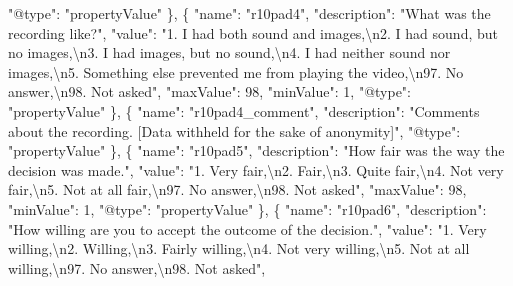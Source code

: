 \documentclass[
]{book}
\newenvironment{Shaded}{\begin{snugshade}}{\end{snugshade}}
\newcommand{\CharTok}[1]{\textcolor[rgb]{0.31,0.60,0.02}{#1}}
\newcommand{\DataTypeTok}[1]{\textcolor[rgb]{0.13,0.29,0.53}{#1}}
\newcommand{\DecValTok}[1]{\textcolor[rgb]{0.00,0.00,0.81}{#1}}
\newcommand{\FunctionTok}[1]{\textcolor[rgb]{0.00,0.00,0.00}{#1}}
\newcommand{\OtherTok}[1]{\textcolor[rgb]{0.56,0.35,0.01}{#1}}
\newcommand{\StringTok}[1]{\textcolor[rgb]{0.31,0.60,0.02}{#1}}
\begin{document}
\begin{Shaded}
\begin{Highlighting}[]
      \DataTypeTok{"@type"}\FunctionTok{:} \StringTok{"propertyValue"}
    \FunctionTok{\}}\OtherTok{,}
    \FunctionTok{\{}
      \DataTypeTok{"name"}\FunctionTok{:} \StringTok{"r10pad4"}\FunctionTok{,}
      \DataTypeTok{"description"}\FunctionTok{:} \StringTok{"What was the recording like?"}\FunctionTok{,}
      \DataTypeTok{"value"}\FunctionTok{:} \StringTok{"1. I had both sound and images,}\CharTok{\textbackslash{}n}\StringTok{2. I had sound, but no images,}\CharTok{\textbackslash{}n}\StringTok{3. I had images, but no sound,}\CharTok{\textbackslash{}n}\StringTok{4. I had neither sound nor images,}\CharTok{\textbackslash{}n}\StringTok{5. Something else prevented me from playing the video,}\CharTok{\textbackslash{}n}\StringTok{97. No answer,}\CharTok{\textbackslash{}n}\StringTok{98. Not asked"}\FunctionTok{,}
      \DataTypeTok{"maxValue"}\FunctionTok{:} \DecValTok{98}\FunctionTok{,}
      \DataTypeTok{"minValue"}\FunctionTok{:} \DecValTok{1}\FunctionTok{,}
      \DataTypeTok{"@type"}\FunctionTok{:} \StringTok{"propertyValue"}
    \FunctionTok{\}}\OtherTok{,}
    \FunctionTok{\{}
      \DataTypeTok{"name"}\FunctionTok{:} \StringTok{"r10pad4_comment"}\FunctionTok{,}
      \DataTypeTok{"description"}\FunctionTok{:} \StringTok{"Comments about the recording. [Data withheld for the sake of anonymity]"}\FunctionTok{,}
      \DataTypeTok{"@type"}\FunctionTok{:} \StringTok{"propertyValue"}
    \FunctionTok{\}}\OtherTok{,}
    \FunctionTok{\{}
      \DataTypeTok{"name"}\FunctionTok{:} \StringTok{"r10pad5"}\FunctionTok{,}
      \DataTypeTok{"description"}\FunctionTok{:} \StringTok{"How fair was the way the decision was made."}\FunctionTok{,}
      \DataTypeTok{"value"}\FunctionTok{:} \StringTok{"1. Very fair,}\CharTok{\textbackslash{}n}\StringTok{2. Fair,}\CharTok{\textbackslash{}n}\StringTok{3. Quite fair,}\CharTok{\textbackslash{}n}\StringTok{4. Not very fair,}\CharTok{\textbackslash{}n}\StringTok{5. Not at all fair,}\CharTok{\textbackslash{}n}\StringTok{97. No answer,}\CharTok{\textbackslash{}n}\StringTok{98. Not asked"}\FunctionTok{,}
      \DataTypeTok{"maxValue"}\FunctionTok{:} \DecValTok{98}\FunctionTok{,}
      \DataTypeTok{"minValue"}\FunctionTok{:} \DecValTok{1}\FunctionTok{,}
      \DataTypeTok{"@type"}\FunctionTok{:} \StringTok{"propertyValue"}
    \FunctionTok{\}}\OtherTok{,}
    \FunctionTok{\{}
      \DataTypeTok{"name"}\FunctionTok{:} \StringTok{"r10pad6"}\FunctionTok{,}
      \DataTypeTok{"description"}\FunctionTok{:} \StringTok{"How willing are you to accept the outcome of the decision."}\FunctionTok{,}
      \DataTypeTok{"value"}\FunctionTok{:} \StringTok{"1. Very willing,}\CharTok{\textbackslash{}n}\StringTok{2. Willing,}\CharTok{\textbackslash{}n}\StringTok{3. Fairly willing,}\CharTok{\textbackslash{}n}\StringTok{4. Not very willing,}\CharTok{\textbackslash{}n}\StringTok{5. Not at all willing,}\CharTok{\textbackslash{}n}\StringTok{97. No answer,}\CharTok{\textbackslash{}n}\StringTok{98. Not asked"}\FunctionTok{,}

\end{Highlighting}
\end{Shaded}
\end{document}

